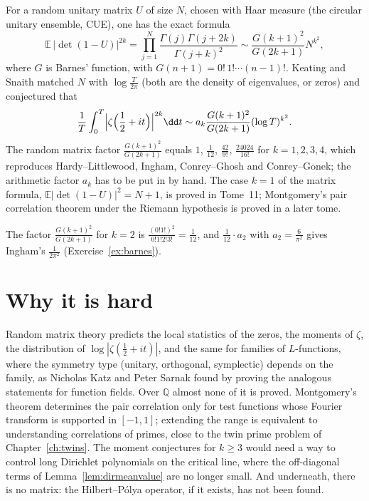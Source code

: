 \begin{remark}\label{rem:keatingsnaith}
For a random unitary matrix $U$ of size $N$, chosen with Haar measure (the circular unitary ensemble, CUE), one has the exact formula
\[
\mathbb E\,|\det(1-U)|^{2k}=\prod_{j=1}^N\frac{\Gamma(j)\Gamma(j+2k)}{\Gamma(j+k)^2}\sim\frac{G(k+1)^2}{G(2k+1)}N^{k^2},
\]
where $G$ is Barnes' function, with $G(n+1)=0!\,1!\cdots(n-1)!$. Keating and Snaith matched $N$ with $\log\frac T{2\pi}$ (both are the density of
eigenvalues, or zeros) and conjectured that
\[
\frac1T\int_0^T\Bigl|\zeta\Bigl(\frac12+it\Bigr)\Bigr|^{2k}\dd t\sim a_k\frac{G(k+1)^2}{G(2k+1)}(\log T)^{k^2}.
\]
The random matrix factor $\frac{G(k+1)^2}{G(2k+1)}$ equals $1$, $\frac1{12}$, $\frac{42}{9!}$, $\frac{24024}{16!}$ for $k=1,2,3,4$, which reproduces Hardy--Littlewood,
Ingham, Conrey--Ghosh and Conrey--Gonek; the arithmetic factor $a_k$ has to be put in by hand. The case $k=1$ of the matrix formula, $\mathbb E|\det(1-U)|^2=N+1$,
is proved in Tome~11; Montgomery's pair correlation theorem under the Riemann hypothesis is proved in a later tome.
\end{remark}

The factor $\frac{G(k+1)^2}{G(2k+1)}$ for $k=2$ is $\frac{(0!1!)^2}{0!1!2!3!}=\frac1{12}$, and $\frac1{12}\cdot a_2$ with $a_2=\frac6{\pi^2}$ gives Ingham's
$\frac1{2\pi^2}$ (Exercise~\ref{ex:barnes}).

\section{Why it is hard}

Random matrix theory predicts the local statistics of the zeros, the moments of $\zeta$, the distribution of $\log|\zeta(\frac12+it)|$, and the same
for families of $L$-functions, where the symmetry type (unitary, orthogonal, symplectic) depends on the family, as Nicholas Katz and Peter Sarnak found by
proving the analogous statements for function fields. Over $\mathbb Q$ almost none of it is proved. Montgomery's theorem determines the pair correlation only
for test functions whose Fourier transform is supported in $[-1,1]$; extending the range is equivalent to understanding correlations of primes, close to
the twin prime problem of Chapter~\ref{ch:twins}. The moment conjectures for $k\ge3$ would need a way to control long Dirichlet polynomials on the
critical line, where the off-diagonal terms of Lemma~\ref{lem:dirmeanvalue} are no longer small. And underneath, there is no matrix: the
Hilbert--P\'olya operator, if it exists, has not been found.

